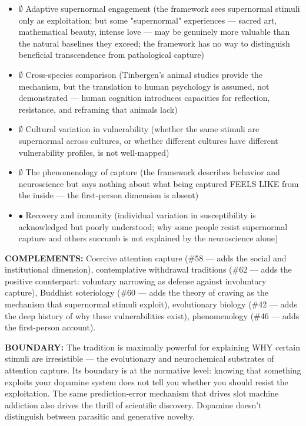 \begin{itemize}[nosep,leftmargin=*]
  \item $\emptyset$ Adaptive supernormal engagement (the framework sees supernormal stimuli only as exploitation; but some "supernormal" experiences — sacred art, mathematical beauty, intense love — may be genuinely more valuable than the natural baselines they exceed; the framework has no way to distinguish beneficial transcendence from pathological capture)
  \item $\emptyset$ Cross-species comparison (Tinbergen's animal studies provide the mechanism, but the translation to human psychology is assumed, not demonstrated — human cognition introduces capacities for reflection, resistance, and reframing that animals lack)
  \item $\emptyset$ Cultural variation in vulnerability (whether the same stimuli are supernormal across cultures, or whether different cultures have different vulnerability profiles, is not well-mapped)
  \item $\emptyset$ The phenomenology of capture (the framework describes behavior and neuroscience but says nothing about what being captured FEELS LIKE from the inside — the first-person dimension is absent)
  \item $\bullet$ Recovery and immunity (individual variation in susceptibility is acknowledged but poorly understood; why some people resist supernormal capture and others succumb is not explained by the neuroscience alone)
\end{itemize}


\textbf{COMPLEMENTS:} Coercive attention capture (\#58 — adds the social and institutional dimension), contemplative withdrawal traditions (\#62 — adds the positive counterpart: voluntary narrowing as defense against involuntary capture), Buddhist soteriology (\#60 — adds the theory of craving as the mechanism that supernormal stimuli exploit), evolutionary biology (\#42 — adds the deep history of why these vulnerabilities exist), phenomenology (\#46 — adds the first-person account).


\textbf{BOUNDARY:} The tradition is maximally powerful for explaining WHY certain stimuli are irresistible — the evolutionary and neurochemical substrates of attention capture. Its boundary is at the normative level: knowing that something exploits your dopamine system does not tell you whether you should resist the exploitation. The same prediction-error mechanism that drives slot machine addiction also drives the thrill of scientific discovery. Dopamine doesn't distinguish between parasitic and generative novelty.



